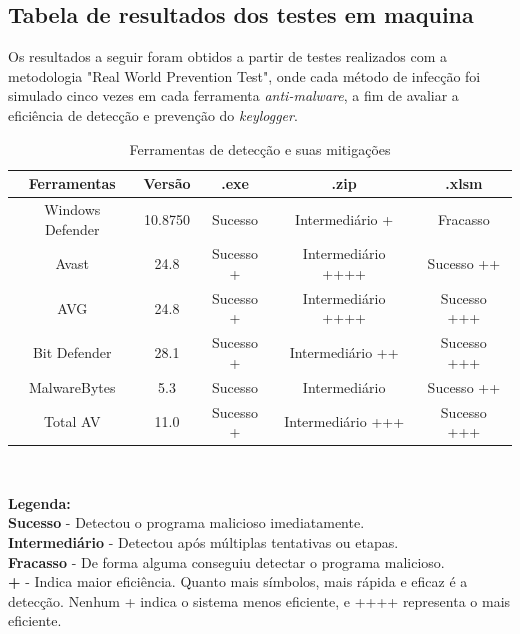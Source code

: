 \documentclass[12pt]{article}
\begin{document}
\subsection{Tabela de resultados dos testes em maquina}
Os resultados a seguir foram obtidos a partir de testes realizados com a metodologia "Real World Prevention Test", onde cada método de infecção foi simulado cinco vezes em cada ferramenta \textit{anti-malware}, a fim de avaliar a eficiência de detecção e prevenção do \textit{keylogger}.
\begin{table}[h!]
    \centering
    \begin{tabular}{|c|c|c|c|c|}
        \hline
        \textbf{Ferramentas} & \textbf{Versão} & \textbf{.exe} & \textbf{.zip}      & \textbf{.xlsm} \\
        \hline
        Windows Defender     & 10.8750    & Sucesso       & Intermediário +    & Fracasso       \\
        \hline
        Avast                & 24.8      & Sucesso +     & Intermediário ++++ & Sucesso ++     \\
        \hline
        AVG                  & 24.8      & Sucesso +     & Intermediário ++++ & Sucesso +++    \\
        \hline
        Bit Defender         & 28.1      & Sucesso +     & Intermediário ++   & Sucesso +++    \\
        \hline
        MalwareBytes         & 5.3       & Sucesso       & Intermediário      & Sucesso ++     \\
        \hline
        Total AV             & 11.0         & Sucesso +     & Intermediário +++  & Sucesso +++    \\
        \hline
    \end{tabular}\\

    \caption{Ferramentas de detecção e suas mitigações}

\end{table}
\begin{flushleft}
    \textbf{Legenda:} \\
    \textbf{Sucesso} - Detectou o programa malicioso imediatamente.\\
    \textbf{Intermediário} - Detectou após múltiplas tentativas ou etapas.\\
    \textbf{Fracasso} - De forma alguma conseguiu detectar o programa malicioso.\\
    \textbf{+} - Indica maior eficiência. Quanto mais símbolos, mais rápida e eficaz é a detecção. Nenhum + indica o sistema menos eficiente, e ++++ representa o mais eficiente.
\end{flushleft}
\end{document}
